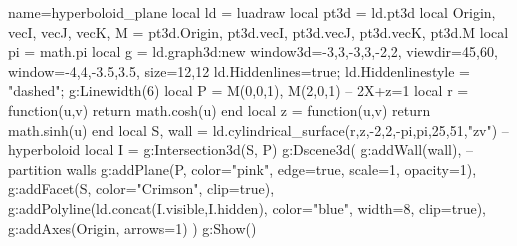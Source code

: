 \documentclass[border=5pt]{standalone}%
\begin{document}
\begin{luadraw}{name=hyperboloid_plane}
local ld = luadraw
local pt3d = ld.pt3d
local Origin, vecI, vecJ, vecK, M = pt3d.Origin, pt3d.vecI, pt3d.vecJ, pt3d.vecK, pt3d.M
local pi = math.pi
local g = ld.graph3d:new{ window3d={-3,3,-3,3,-2,2}, viewdir={45,60}, 
    window={-4,4,-3.5,3.5}, size={12,12}}
ld.Hiddenlines=true; ld.Hiddenlinestyle = "dashed"; g:Linewidth(6)
local P = {M(0,0,1), M(2,0,1)} -- 2X+z=1
local r = function(u,v) return math.cosh(u) end
local z = function(u,v) return math.sinh(u) end
local S, wall = ld.cylindrical_surface(r,z,-2,2,-pi,pi,{25,51},"zv") -- hyperboloid
local I = g:Intersection3d(S, P)
g:Dscene3d(
    g:addWall(wall), --partition walls
    g:addPlane(P, {color="pink", edge=true, scale=1, opacity=1}),
    g:addFacet(S, {color="Crimson", clip=true}),
    g:addPolyline(ld.concat(I.visible,I.hidden), {color="blue", width=8, clip=true}),
    g:addAxes(Origin, {arrows=1})
    )
g:Show()
\end{luadraw}
\end{document}
